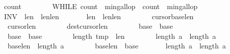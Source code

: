 \begin{isabellebody}
\ \ \ \ \ \ {\isasymacute}count{}\ {\isacharcolon}{\isacharequal}{\isacharequal}\ {}{\isacharsemicolon}{\isacharsemicolon}\isanewline
\ \ \ \ \ \ WHILE\ {\isacharparenleft}{\isasymacute}count{}\ {\isacharless}\ {\isasymacute}min{\isacharunderscore}gallop\ {\isacharampersand}\ {\isasymacute}count{}\ {\isacharless}\ {\isasymacute}min{\isacharunderscore}gallop{\isacharparenright}\isanewline
\ \ \ \ \ \ INV\ {\isasymlbrace}\ {\isasymacute}len{}{\isachargreater}{}\ {\isasymand}\ {\isasymacute}len{}{\isacharless}\isactrlbsup {\isasymsigma}\isactrlesup len{}\ {\isasymand}\isanewline
\ \ \ \ \ \ {\isasymacute}len{}{\isachargreater}{}\ {\isasymand}\ {\isasymacute}len{}{\isasymle}\isactrlbsup {\isasymsigma}\isactrlesup len{}\ {\isasymand}\isanewline
\ \ \ \ \ \ \ {\isasymacute}cursor{}{\isacharplus}{}{\isacharequal}{\isasymacute}base{}{\isacharplus}{\isasymacute}len{}\ {\isasymand}\isanewline
\ \ \ \ \ \ \ {\isasymacute}cursor{}{\isacharplus}{}{\isacharequal}{\isasymacute}len{}\ {\isasymand}\isanewline
\ \ \ \ \ \ \ {\isasymacute}dest{\isacharequal}{\isasymacute}cursor{}{\isacharplus}{\isasymacute}len{}\ {\isasymand}\isanewline
\ \ \ \ \ \ \ {\isasymacute}base{}\ {\isacharequal}\ \isactrlbsup {\isasymsigma}\isactrlesup base{}\ {\isasymand}\isanewline
\ \ \ \ \ \ \ {\isasymacute}base{}\ {\isacharequal}\ \isactrlbsup {\isasymsigma}\isactrlesup base{}\ {\isasymand}\isanewline
\ \ \ \ \ \ \ length\ {\isasymacute}tmp\ {\isacharequal}\ \isactrlbsup {\isasymsigma}\isactrlesup len{}\ {\isasymand}\isanewline
\ \ \ \ \ \ \ length\ {\isasymacute}a\ {\isacharequal}\ length\ \isactrlbsup {\isasymsigma}\isactrlesup a\ {\isasymand}\isanewline
\ \ \ \ \ \ \ {\isacharparenleft}\isactrlbsup {\isasymsigma}\isactrlesup base{}{\isacharplus}\isactrlbsup {\isasymsigma}\isactrlesup len{}\ {\isasymle}\ length\ \isactrlbsup {\isasymsigma}\isactrlesup a{\isacharparenright}\ {\isasymand}\isanewline
\ \ \ \ \ \ \ {\isacharparenleft}\isactrlbsup {\isasymsigma}\isactrlesup base{}{\isacharplus}\isactrlbsup {\isasymsigma}\isactrlesup len{}\ {\isacharequal}\ \isactrlbsup {\isasymsigma}\isactrlesup base{}{\isacharparenright}{\isasymand}\isanewline
\ \ \ \ \ \ \ length\ {\isasymacute}a\ {\isacharequal}\ length\ \isactrlbsup {\isasymsigma}\isactrlesup a\ {\isasymand}\isanewline

\end{isabellebody}
